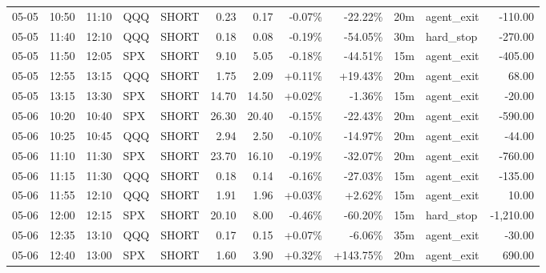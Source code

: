 \documentclass[11pt,a4paper]{article}
\begin{document}
\begin{center}
\begin{longtable}{>{\color{txtmain}}l l l l l r r r r r >{\color{txtmain}}l r}
05-05 & 10:50 & 11:10 & QQQ & SHORT & 0.23 & 0.17 & \textcolor{lossred}{-0.07\%} & \textcolor{lossred}{-22.22\%} & 20m & agent\_exit & \textcolor{lossred}{-110.00} \\
05-05 & 11:40 & 12:10 & QQQ & SHORT & 0.18 & 0.08 & \textcolor{lossred}{-0.19\%} & \textcolor{lossred}{-54.05\%} & 30m & hard\_stop & \textcolor{lossred}{-270.00} \\
05-05 & 11:50 & 12:05 & SPX & SHORT & 9.10 & 5.05 & \textcolor{lossred}{-0.18\%} & \textcolor{lossred}{-44.51\%} & 15m & agent\_exit & \textcolor{lossred}{-405.00} \\
05-05 & 12:55 & 13:15 & QQQ & SHORT & 1.75 & 2.09 & \textcolor{wingreen}{+0.11\%} & \textcolor{wingreen}{+19.43\%} & 20m & agent\_exit & \textcolor{wingreen}{68.00} \\
05-05 & 13:15 & 13:30 & SPX & SHORT & 14.70 & 14.50 & \textcolor{wingreen}{+0.02\%} & \textcolor{lossred}{-1.36\%} & 15m & agent\_exit & \textcolor{lossred}{-20.00} \\
05-06 & 10:20 & 10:40 & SPX & SHORT & 26.30 & 20.40 & \textcolor{lossred}{-0.15\%} & \textcolor{lossred}{-22.43\%} & 20m & agent\_exit & \textcolor{lossred}{-590.00} \\
05-06 & 10:25 & 10:45 & QQQ & SHORT & 2.94 & 2.50 & \textcolor{lossred}{-0.10\%} & \textcolor{lossred}{-14.97\%} & 20m & agent\_exit & \textcolor{lossred}{-44.00} \\
05-06 & 11:10 & 11:30 & SPX & SHORT & 23.70 & 16.10 & \textcolor{lossred}{-0.19\%} & \textcolor{lossred}{-32.07\%} & 20m & agent\_exit & \textcolor{lossred}{-760.00} \\
05-06 & 11:15 & 11:30 & QQQ & SHORT & 0.18 & 0.14 & \textcolor{lossred}{-0.16\%} & \textcolor{lossred}{-27.03\%} & 15m & agent\_exit & \textcolor{lossred}{-135.00} \\
05-06 & 11:55 & 12:10 & QQQ & SHORT & 1.91 & 1.96 & \textcolor{wingreen}{+0.03\%} & \textcolor{wingreen}{+2.62\%} & 15m & agent\_exit & \textcolor{wingreen}{10.00} \\
05-06 & 12:00 & 12:15 & SPX & SHORT & 20.10 & 8.00 & \textcolor{lossred}{-0.46\%} & \textcolor{lossred}{-60.20\%} & 15m & hard\_stop & \textcolor{lossred}{-1,210.00} \\
05-06 & 12:35 & 13:10 & QQQ & SHORT & 0.17 & 0.15 & \textcolor{wingreen}{+0.07\%} & \textcolor{lossred}{-6.06\%} & 35m & agent\_exit & \textcolor{lossred}{-30.00} \\
05-06 & 12:40 & 13:00 & SPX & SHORT & 1.60 & 3.90 & \textcolor{wingreen}{+0.32\%} & \textcolor{wingreen}{+143.75\%} & 20m & agent\_exit & \textcolor{wingreen}{690.00} \\

\end{longtable}
\end{center}
\end{document}
